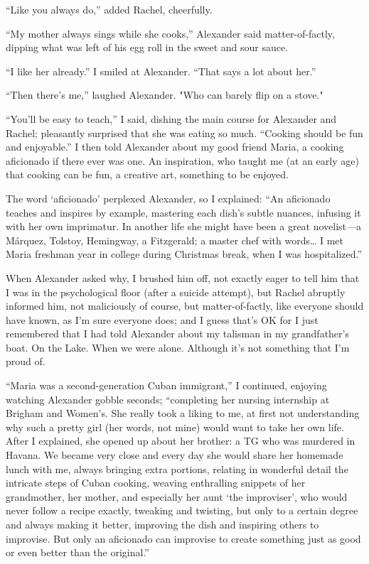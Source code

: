``Like you always do,'' added Rachel, cheerfully.

``My mother always sings while she cooks,'' Alexander said
matter-of-factly, dipping what was left of his egg roll in the sweet and
sour sauce.

``I like her already.'' I smiled at Alexander. ``That says a lot about
her.''

``Then there's me,'' laughed Alexander. "Who can barely flip on a
stove."

``You'll be easy to teach,'' I said, dishing the main course for
Alexander and Rachel; pleasantly surprised that she was eating so much.
``Cooking should be fun and enjoyable.'' I then told Alexander about my
good friend Maria, a cooking aficionado if there ever was one. An
inspiration, who taught me (at an early age) that cooking can be fun, a
creative art, something to be enjoyed.

The word `aficionado' perplexed Alexander, so I explained: ``An
aficionado teaches and inspires by example, mastering each dish's subtle
nuances, infusing it with her own imprimatur. In another life she might
have been a great novelist---a Márquez, Tolstoy, Hemingway, a
Fitzgerald; a master chef with words\ldots{} I met Maria freshman year
in college during Christmas break, when I was hospitalized.''

When Alexander asked why, I brushed him off, not exactly eager to tell
him that I was in the psychological floor (after a suicide attempt), but
Rachel abruptly informed him, not maliciously of course, but
matter-of-factly, like everyone should have known, as I'm sure everyone
does; and I guess that's OK for I just remembered that I had told
Alexander about my talisman in my grandfather's boat. On the Lake. When
we were alone. Although it's not something that I'm proud of.

``Maria was a second-generation Cuban immigrant,'' I continued, enjoying
watching Alexander gobble seconds; ``completing her nursing internship
at Brigham and Women's. She really took a liking to me, at first not
understanding why such a pretty girl (her words, not mine) would want to
take her own life. After I explained, she opened up about her brother: a
TG who was murdered in Havana. We became very close and every day she
would share her homemade lunch with me, always bringing extra portions,
relating in wonderful detail the intricate steps of Cuban cooking,
weaving enthralling snippets of her grandmother, her mother, and
especially her aunt `the improviser', who would never follow a recipe
exactly, tweaking and twisting, but only to a certain degree and always
making it better, improving the dish and inspiring others to improvise.
But only an aficionado can improvise to create something just as good or
even better than the original.''


